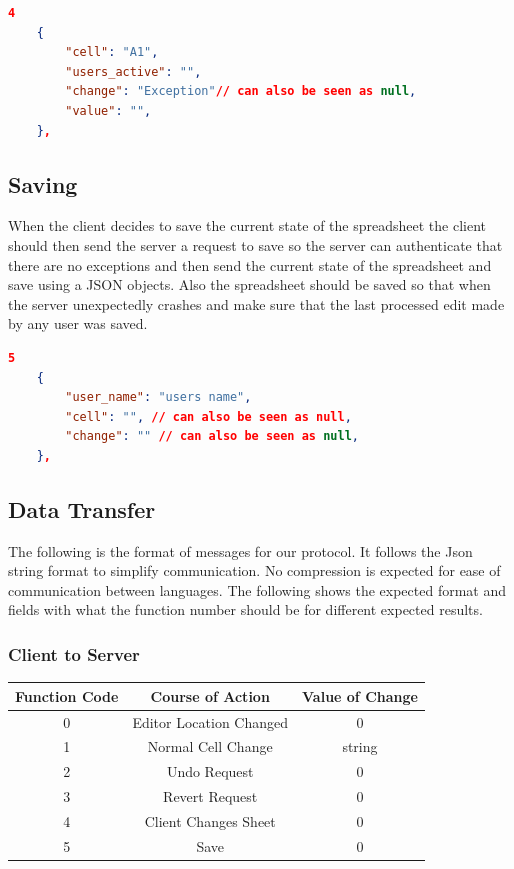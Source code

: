 \documentclass[titlepage]{article}
\begin{document}
    \begin{lstlisting}[language=json,firstnumber=1]
    4
    {
        "cell": "A1",
        "users_active": "",
        "change": "Exception"// can also be seen as null,
        "value": "",
    }, 
    \end{lstlisting}

\subsection{Saving}
    When the client decides to save the current state of the spreadsheet the client should then 
    send the server a request to save so the server can authenticate that there are no exceptions 
    and then send the current state of the spreadsheet and save using a JSON objects. Also the 
    spreadsheet should be saved so that when the server unexpectedly crashes and make sure that 
    the last processed edit made by any user was saved.
    \begin{lstlisting}[language=json,firstnumber=1]
    5
    {
        "user_name": "users name",
        "cell": "", // can also be seen as null,
        "change": "" // can also be seen as null,
    }, 
    \end{lstlisting}

\subsection{Data Transfer}
    The following is the format of messages for our protocol. It follows the Json string format to
    simplify communication. No compression is expected for ease of communication between languages. 
    The following shows the expected format and fields with what the function number should be for 
    different expected results. 

    \subsubsection{Client to Server}
        \centering
        \begin{tabular}{| c | c | c |}
            \hline 
            Function Code & Course of Action & Value of Change\\ \hline
            0 & Editor Location Changed & 0 \\
            1 & Normal Cell Change & string \\
            2 & Undo Request & 0 \\
            3 & Revert Request & 0 \\
            4 & Client Changes Sheet & 0 \\
            5 & Save & 0 \\
            \hline            
        \end{tabular}
\end{document}
